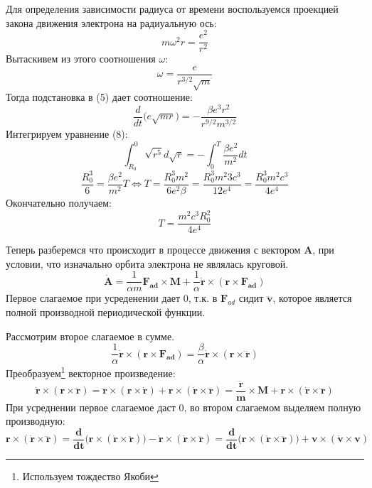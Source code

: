 \documentclass[12pt]{article}
\begin{document}
  	Для определения зависимости радиуса от времени воспользуемся проекцией закона движения электрона на радиуальную ось:
  	\begin{equation}
  		m\omega^2 r = \frac{e^2}{r^2}
  	\end{equation}
  	Вытаскивем из этого соотношения $\omega$:
  	\begin{equation}
  		\omega = \frac{e}{r^{3/2}\sqrt{m} }
  	\end{equation}
  	Тогда подстановка в (5) дает соотношение:
  	\begin{equation}
  		\frac{d}{dt}\Big(e\sqrt{mr}\Big) = -\frac{\beta e^3r^2}{r^{9/2}m^{3/2}}
  	\end{equation}
  	Интегрируем уравнение (8):
  	\begin{equation}
  		\int_{R_0}^{0} \sqrt{r^5} d\sqrt{r} = -\int_0^{T} \frac{\beta e^2}{m^2} dt
  	\end{equation}
  	\begin{equation}
  		\frac{R_0^3}{6} = \frac{\beta e^2}{m^2}T \Leftrightarrow T = \frac{R_0^3m^2}{6e^2\beta} = \frac{R_0^3 m^2 3c^3}{12 e^4} = \frac{R_0^3 m^2c^3}{4e^4}
  	\end{equation}
  	Окончательно получаем:
  	\[\boxed{T = \frac{m^2c^3R_0^2}{4e^4}}\]
  	
  	
  	Теперь разберемся что происходит в процессе движения с вектором $\mathbf{A}$, при условии, что изначально орбита электрона не являлась круговой.
  	\begin{equation}
  		\mathbf{\dot{A} = }\frac{1}{\alpha m} \mathbf{F_{ad} \times M} + \frac{1}{\alpha} \mathbf{\dot{r}\times(r\times F_{ad}) }
  	\end{equation}
  	Первое слагаемое при усреденении дает 0, т.к. в $\mathbf{F}_{ad}$ сидит $\mathbf{\ddot{v}}$, которое является полной производной периодической функции.
  	
  	
  	Рассмотрим второе слагаемое в сумме.
  	\[\frac{1}{\alpha}\mathbf{\dot{r}\times (r \times F_{ad})} = \frac{\beta}{\alpha} \mathbf{\dot{r}\times (r \times \dddot{r})}\]
  	Преобразуем\footnote{Используем тождество Якоби} векторное произведение:
  	\begin{equation}
  		\mathbf{
  			\dot{r}\times (r \times \dddot{r}) = \dddot{r}\times (r \times \dot{r}) + r\times(\dot{r}\times\dddot{r}) = \frac{\dddot{r}}{m}\times M + r\times(\dot{r}\times\dddot{r})
  		  		}  
  	\end{equation}
  	При усреднении первое слагаемое даст 0, во втором слагаемом выделяем полную производную:
  	\[
  	\mathbf{  	
  		r\times(\dot{r}\times\dddot{r}) = \frac{d}{dt}\Big(r\times (\dot{r}\times\ddot{r})\Big) - \dot{r}\times(\dot{r}\times\ddot{r}) = \frac{d}{dt}\Big(r\times (\dot{r}\times\ddot{r})\Big) + v\times (\dot{v}\times v)
  	}\]
  
\end{document}
